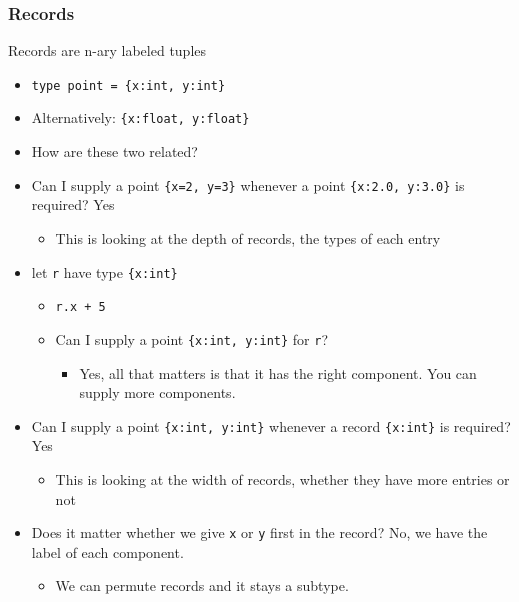 \documentclass[11pt]{article}
\begin{document}
\subsubsection{Records}
\label{sec:org1006f5b}
Records are n-ary labeled tuples
\begin{itemize}
\item \texttt{type point = \{x:int, y:int\}}
\item Alternatively: \texttt{\{x:float, y:float\}}
\item How are these two related?
\item Can I supply a point \texttt{\{x=2, y=3\}} whenever a point \texttt{\{x:2.0, y:3.0\}} is required? Yes
\begin{itemize}
\item This is looking at the depth of records, the types of each entry
\end{itemize}
\item let \texttt{r} have type \texttt{\{x:int\}}
\begin{itemize}
\item \texttt{r.x + 5}
\item Can I supply a point \texttt{\{x:int, y:int\}} for \texttt{r}?
\begin{itemize}
\item Yes, all that matters is that it has the right component. You can supply more components.
\end{itemize}
\end{itemize}
\item Can I supply a point \texttt{\{x:int, y:int\}} whenever a record \texttt{\{x:int\}} is required? Yes
\begin{itemize}
\item This is looking at the width of records, whether they have more entries or not
\end{itemize}
\item Does it matter whether we give \texttt{x} or \texttt{y} first in the record? No, we have the label of each component.
\begin{itemize}
\item We can permute records and it stays a subtype.
\end{itemize}
\end{itemize}
\end{document}
